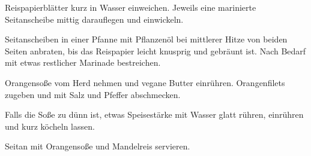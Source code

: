 \begin{recipe}
{    \step%
    Reispapierblätter kurz in Wasser einweichen. Jeweils eine marinierte Seitanscheibe mittig darauflegen und einwickeln.
    
    \step%
    Seitanscheiben in einer Pfanne mit Pflanzenöl bei mittlerer Hitze von beiden Seiten anbraten, bis das Reispapier leicht knusprig und gebräunt ist. Nach Bedarf mit etwas restlicher Marinade bestreichen.
    
    \step%
    Orangensoße vom Herd nehmen und vegane Butter einrühren. Orangenfilets zugeben und mit Salz und Pfeffer abschmecken.
    
    \step%
    Falls die Soße zu dünn ist, etwas Speisestärke mit Wasser glatt rühren, einrühren und kurz köcheln lassen.
    
    \step%
    Seitan mit Orangensoße und Mandelreis servieren.
}



\end{recipe}